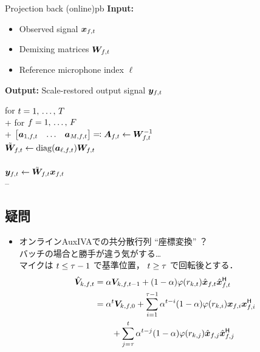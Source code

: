\documentclass[twocolumn,9pt,dvipdfmx]{article}
\begin{document}
\clearpage
\begin{algorithm}{Projection back (online)}{pb}
  \textbf{Input:}
    \begin{itemize}
      \item Observed signal $\Obs _{\ft}$
      \item Demixing matrices $\Demix _{\ft}$
      \item Reference microphone index $\ell$
    \end{itemize}
  \textbf{Output:} Scale-restored output signal $\Est _{\ft}$
  \begin{pseudo}
    for $t = 1,\, \dots,\, T$ \\+
      for $f = 1,\, \dots,\, F$ \\+
        $\begin{bmatrix} \steer _{1,\ft} & \dots & \steer _{\Mic,\ft} \end{bmatrix} \eqqcolon \Steer _{\ft} \gets \Demix _{\ft} ^{-1}$ \\
        $\tilde{\Demix} _{\ft} \gets \mathrm{diag}(\steer _{\ell,\ft}) \Demix _{\ft}$ \\
         \\
        $\Est _{\ft} \gets \tilde{\Demix} _{\ft} \Obs _{\ft}$ \\--
  \end{pseudo}
\end{algorithm}

\subsection*{疑問}
\begin{itemize}
  \item オンラインAuxIVAでの共分散行列 ``座標変換'' ？\\ バッチの場合と勝手が違う気がする…\\
    マイクは $t \leq \tau - 1$ で基準位置，
    $t \geq \tau$ で回転後とする．
    \begin{align*}
      \rot{\cov} _{\src,\ft} &= \forget \cov _{\src,\ft[-1]} + (1 - \forget) \weight(\var _{\src,\tframe}) \rot{\Obs} _{\ft} \rot{\Obs} _{\ft} ^{\hermite} \\
                             &= \forget ^{\tframe} \cov _{\src,\freq,0}
                                + \sum _{i = 1} ^{\rotFra - 1} \forget ^{\tframe - i} (1 - \forget) \weight(\var _{\src,i}) \Obs _{\freq,i} \Obs _{\freq,i} ^{\hermite} \\
                             &\qquad + \sum _{j = \rotFra} ^{\tframe} \forget ^{\tframe - j} (1 - \forget) \weight(\var _{\src,j}) \rot{\Obs} _{\freq,j} \rot{\Obs} _{\freq,j} ^{\hermite}
    \end{align*}
\end{itemize}
\end{document}
